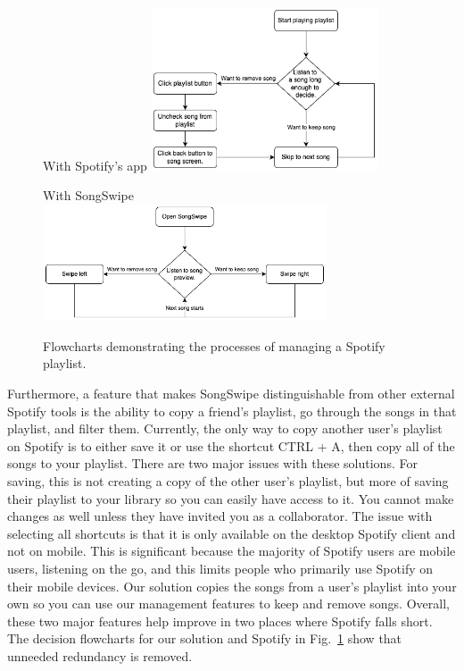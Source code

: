 \documentclass{article}
\begin{document}
\begin{figure}[h]
    \centering
    \begin{subcaptionbox}{With Spotify's app\label{fig:diagram1}}
        {\includegraphics[width=0.60\textwidth]{./flow1.png}}
    \end{subcaptionbox}
    \hspace{1em} %
    \begin{subcaptionbox}{With SongSwipe\label{fig:diagram2}}
        {\includegraphics[width=0.75\textwidth]{./flow2.png}}
    \end{subcaptionbox}
    \caption{Flowcharts demonstrating the processes of managing a Spotify playlist.}
    \label{fig:both_diagrams}
\end{figure}

\quad Furthermore, a feature that makes SongSwipe distinguishable from other external Spotify tools is the ability to copy a friend's playlist, go through the songs in that playlist, and filter them. Currently, the only way to copy another user’s playlist on Spotify is to either save it or use the shortcut CTRL + A, then copy all of the songs to your playlist. There are two major issues with these solutions. For saving, this is not creating a copy of the other user’s playlist, but more of saving their playlist to your library so you can easily have access to it. You cannot make changes as well unless they have invited you as a collaborator. The issue with selecting all shortcuts is that it is only available on the desktop Spotify client and not on mobile. This is significant because the majority of Spotify users are mobile users, listening on the go, and this limits people who primarily use Spotify on their mobile devices. Our solution copies the songs from a user’s playlist into your own so you can use our management features to keep and remove songs. Overall, these two major features help improve in two places where Spotify falls short. The decision flowcharts for our solution and Spotify in Fig.~\ref{fig:both_diagrams} show that unneeded redundancy is removed.
\end{document}
